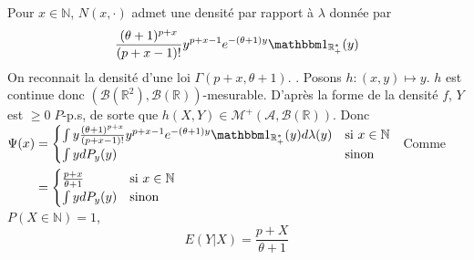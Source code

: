 \documentclass{report}
\begin{document}
Pour $x\in \mathbb N$, $N(x,\cdot)$ admet une densité par rapport à $\lambda$ donnée par $$\frac{(\theta+1)^{p+x}}{(p+x-1)!} y^{p+x-1}e^{-(\theta+1)y} \mathbbm 1_{\mathbb R_+^*}(y) $$
On reconnait la densité d'une loi $\Gamma(p+x,\theta+1)$.\newline
{}. Posons $h:(x,y)\mapsto y$. $h$ est continue donc $(\mathcal B(\mathbb R^2),\mathcal B(\mathbb R))$-mesurable. D'après la forme de la densité $f$, $Y$ est $\geq 0 \; P$-p.s, de sorte que $h(X,Y)\in \mathcal M^+(\mathcal A,\mathcal B(\mathbb R))$. \newline
Donc $\begin{aligned}[t]
\Psi(x)&=\begin{cases}
\int y \frac{(\theta+1)^{p+x}}{(p+x-1)!} y^{p+x-1}e^{-(\theta+1)y} \mathbbm 1_{\mathbb R_+^*}(y) d\lambda(y) & \text{si } x\in \mathbb N \\
\int y dP_y(y) & \text{sinon }
\end{cases} \\
&=\begin{cases}
\frac{p+x}{\theta +1} & \text{si } x\in \mathbb N \\
\int y dP_y(y) & \text{sinon }
\end{cases}
\end{aligned}$ \newline
Comme $P(X\in \mathbb N)=1$, $$E(Y|X)=\frac{p+X}{\theta +1}$$
\end{document}
